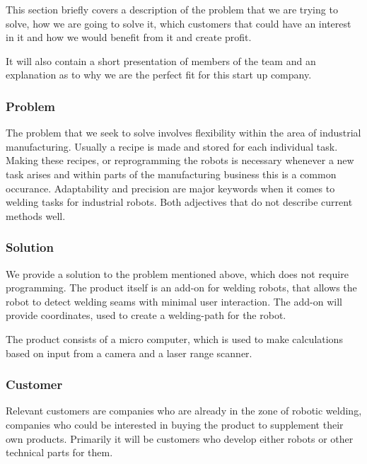 



This section briefly covers a description of the problem that we are trying to solve, how we are going to solve it, which customers that could have an interest in it and how we would benefit from it and create profit.

It will also contain a short presentation of members of the team and an explanation as to why we are the perfect fit for this start up company.

\subsubsection{Problem}
The problem that we seek to solve involves flexibility within the area of industrial manufacturing. Usually a recipe is made and stored for each individual task.
Making these recipes, or reprogramming the robots is necessary whenever a new task arises and within parts of the manufacturing business this is a common occurance. 
Adaptability and precision are major keywords when it comes to welding tasks for industrial robots. Both adjectives that do not describe current methods well.

\subsubsection{Solution}
We provide a solution to the problem mentioned above, which does not require programming. The product itself is an add-on for welding robots, that allows the robot to detect welding seams with minimal user interaction. The add-on will provide coordinates, used to create a welding-path for the robot. 

The product consists of a micro computer, which is used to make calculations based on input from a camera and a laser range scanner. 

\subsubsection{Customer}
Relevant customers are companies who are already in the zone of robotic welding, companies who could be interested in buying the product to supplement their own products. Primarily it will be customers who develop either robots or other technical parts for them.  

